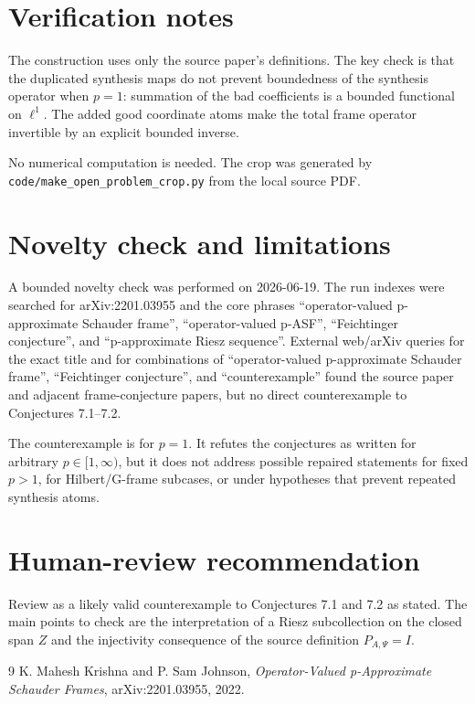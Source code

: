 \documentclass[11pt]{article}
\begin{document}
\section*{Verification notes}

The construction uses only the source paper's definitions.  The key check is
that the duplicated synthesis maps do not prevent boundedness of the synthesis
operator when $p=1$: summation of the bad coefficients is a bounded functional
on $\ell^1$.  The added good coordinate atoms make the total frame operator
invertible by an explicit bounded inverse.

No numerical computation is needed.  The crop was generated by
\texttt{code/make\_open\_problem\_crop.py} from the local source PDF.

\section*{Novelty check and limitations}

A bounded novelty check was performed on 2026-06-19.  The run indexes were
searched for arXiv:2201.03955 and the core phrases ``operator-valued
p-approximate Schauder frame'', ``operator-valued p-ASF'', ``Feichtinger
conjecture'', and ``p-approximate Riesz sequence''.  External web/arXiv
queries for the exact title and for combinations of ``operator-valued
p-approximate Schauder frame'', ``Feichtinger conjecture'', and
``counterexample'' found the source paper and adjacent frame-conjecture papers,
but no direct counterexample to Conjectures 7.1--7.2.

The counterexample is for $p=1$.  It refutes the conjectures as written for
arbitrary $p\in[1,\infty)$, but it does not address possible repaired
statements for fixed $p>1$, for Hilbert/G-frame subcases, or under hypotheses
that prevent repeated synthesis atoms.

\section*{Human-review recommendation}

Review as a likely valid counterexample to Conjectures 7.1 and 7.2 as stated.
The main points to check are the interpretation of a Riesz subcollection on
the closed span $Z$ and the injectivity consequence of the source definition
$P_{A,\Psi}=I$.

\begin{thebibliography}{9}
K. Mahesh Krishna and P. Sam Johnson,
\emph{Operator-Valued p-Approximate Schauder Frames},
arXiv:2201.03955, 2022.
\end{thebibliography}
\end{document}
